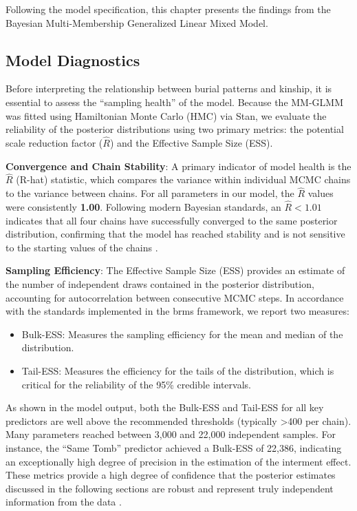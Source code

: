 \documentclass[
]{ajs}
\providecommand{\tightlist}{%
  \setlength{\itemsep}{0pt}\setlength{\parskip}{0pt}}
\begin{document}
Following the model specification, this chapter presents the findings
from the Bayesian Multi-Membership Generalized Linear Mixed Model.

\subsection{Model Diagnostics}\label{model-diagnostics}

Before interpreting the relationship between burial patterns and
kinship, it is essential to assess the ``sampling health'' of the model.
Because the MM-GLMM was fitted using Hamiltonian Monte Carlo (HMC) via
Stan, we evaluate the reliability of the posterior distributions using
two primary metrics: the potential scale reduction factor (\(\hat{R}\))
and the Effective Sample Size (ESS).

\textbf{Convergence and Chain Stability}: A primary indicator of model
health is the \(\hat{R}\) (R-hat) statistic, which compares the variance
within individual MCMC chains to the variance between chains. For all
parameters in our model, the \(\hat{R}\) values were consistently
\textbf{1.00}. Following modern Bayesian standards, an
\(\hat{R} < 1.01\) indicates that all four chains have successfully
converged to the same posterior distribution, confirming that the model
has reached stability and is not sensitive to the starting values of the
chains \citet{vehtari2021rank}.

\textbf{Sampling Efficiency}: The Effective Sample Size (ESS) provides
an estimate of the number of independent draws contained in the
posterior distribution, accounting for autocorrelation between
consecutive MCMC steps. In accordance with the standards implemented in
the brms framework, we report two measures:

\begin{itemize}
\tightlist
\item
  Bulk-ESS: Measures the sampling efficiency for the mean and median of
  the distribution.
\item
  Tail-ESS: Measures the efficiency for the tails of the distribution,
  which is critical for the reliability of the 95\% credible intervals.
\end{itemize}

As shown in the model output, both the Bulk-ESS and Tail-ESS for all key
predictors are well above the recommended thresholds (typically
\textgreater400 per chain). Many parameters reached between 3,000 and
22,000 independent samples. For instance, the ``Same Tomb'' predictor
achieved a Bulk-ESS of 22,386, indicating an exceptionally high degree
of precision in the estimation of the interment effect. These metrics
provide a high degree of confidence that the posterior estimates
discussed in the following sections are robust and represent truly
independent information from the data \citet{vehtari2021rank}.
\end{document}
